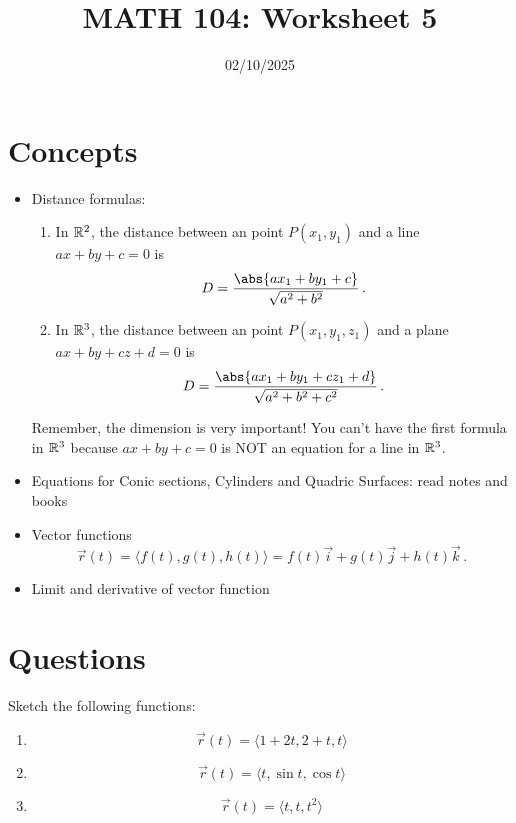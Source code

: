 \documentclass[12pt]{amsart}
\title{ MATH 104: Worksheet 5}
\author{}
\date{02/10/2025}
\begin{document}
\maketitle

\section{Concepts}

\begin{itemize}
	\item Distance formulas:
	      \begin{enumerate}
		      \item In $\mathbb{R}^2$, the distance between an point $P(x_1, y_1)$ and a line $ax + by + c = 0$ is
		            \begin{equation*}
			            D =   \frac{\abs{ ax_1 + b y_1 + c }}{\sqrt{a^2 + b^2}} \,.
		            \end{equation*}
		      \item In $\mathbb{R}^3$, the distance between an point $P(x_1, y_1, z_1)$ and a plane $ax + by + cz + d = 0$ is
		            \begin{equation*}
			            D =  \frac{\abs{ ax_1 + b y_1 + cz_1 + d }}{\sqrt{a^2 + b^2 + c^2}} \,.
		            \end{equation*}
	      \end{enumerate}
	      Remember, the dimension is very important! You can't have the first formula in $\mathbb{R}^3$
	      because $ax + by + c = 0$ is
	      NOT an equation for a line in $\mathbb{R}^3$.

	\item Equations for Conic sections, Cylinders and Quadric Surfaces: read notes and books

	\item Vector functions
	      \begin{equation*}
		      \vec{r}(t) = \langle f(t), g(t), h(t) \rangle = f(t) \vec{i} + g(t) \vec{j} + h(t) \vec{k} \,.
	      \end{equation*}
	\item Limit and derivative of vector function
\end{itemize}

\newpage
\section{Questions}

\begin{question}
	Sketch the following functions:
	\begin{enumerate}
		\item $$ \vec{r}(t) = \langle 1 + 2t, 2 + t , t \rangle$$
		      \vspace{7cm}
		\item $$ \vec{r}(t) = \langle t, \sin t, \cos t \rangle $$
		      \vspace{7cm}
		\item $$ \vec{r}(t) = \langle t, t, t^2 \rangle$$
		      \vspace{7cm}
	\end{enumerate}
\end{question}
\end{document}
